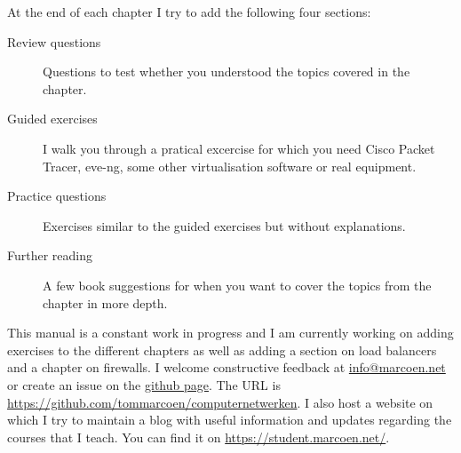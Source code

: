 At the end of each chapter I try to add the following four sections:
\begin{description}
\item[Review questions] Questions to test whether you understood the topics covered in the chapter.
\item[Guided exercises] I walk you through a pratical excercise for which you need Cisco Packet Tracer, eve-ng, some other virtualisation software or real equipment.
\item[Practice questions] Exercises similar to the guided exercises but without explanations.
\item[Further reading] A few book suggestions for when you want to cover the topics from the chapter in more depth.
\end{description}

This manual is a constant work in progress and I am currently working on adding exercises to the different chapters as well as adding a section on load balancers and a chapter on firewalls.
I welcome constructive feedback at \href{mailto:info@marcoen.net}{info@\-marcoen.net} or create an issue on the \href{https://github.com/tommarcoen/computernetwerken}{github page}.
The \acs{URL} is \url{https://github.com/tommarcoen/computernetwerken}.
I also host a website on which I try to maintain a blog with useful information and updates regarding the courses that I teach.
You can find it on \url{https://student.marcoen.net/}.



